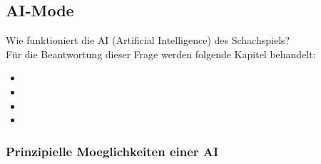\documentclass[12pt,a4paper]{article}
\begin{document}
{%

\subsection{AI-Mode}

Wie funktioniert die AI (Artificial Intelligence) des Schachspiels? \\
Für die Beantwortung dieser Frage werden folgende Kapitel behandelt:

\begin{itemize}
	\item{}
	\item{}
	\item{}
	\item{}
\end{itemize}



\subsubsection{Prinzipielle Moeglichkeiten einer AI}
\label{SUBSUBSEC:GenAI}

}
\end{document}
